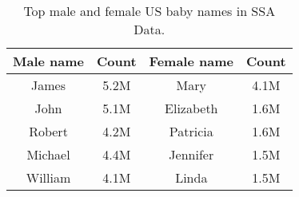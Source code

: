 \documentclass[conference,compsoc]{IEEEtran}
\begin{document}
\begin{table}[h]
\centering
\begin{tabular}{|c|c|c|c}
\hline
Male name & Count & Female name  & Count\\ \hline
James  & 5.2M  & Mary & 4.1M  \\ \hline
John  & 5.1M  & Elizabeth & 1.6M  \\ \hline
Robert & 4.2M & Patricia & 1.6M \\ \hline
Michael & 4.4M & Jennifer & 1.5M \\ \hline
William & 4.1M & Linda & 1.5M \\ \hline
\end{tabular}
\caption{Top male and female US baby names in SSA Data.}
\label{tab:exemplo}
\end{table}







%
%

\end{document}
